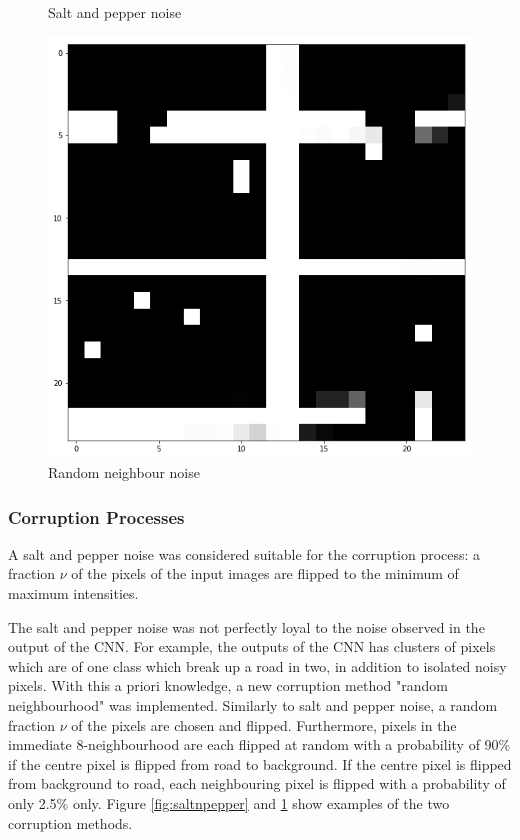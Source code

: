 \documentclass[10pt,conference,compsocconf]{IEEEtran}
\begin{document}
\begin{figure}[!htb]
  \caption{Salt and pepper noise}\label{fig:saltnpepper}
\endminipage\hfill
{}%
  \includegraphics[width=\linewidth]{NoiseExamples_RandomNeighbourhood.png}
  \caption{Random neighbour noise}\label{fig:neighbour}
\endminipage
\end{figure}

\subsubsection{Corruption Processes}

A salt and pepper noise \cite{VincentPASCALVINCENT2010} was considered suitable for the corruption process: a fraction $\nu$ of the pixels of the input images are flipped to the minimum of maximum intensities.

The salt and pepper noise was not perfectly loyal to the noise observed in the output of the CNN. For example, the outputs of the CNN has clusters of pixels which are of one class which break up a road in two, in addition to isolated noisy pixels. With this a priori knowledge, a new corruption method "random neighbourhood" was implemented. Similarly to salt and pepper noise, a random fraction $\nu$ of the pixels are chosen and flipped. Furthermore, pixels in the immediate 8-neighbourhood are each flipped at random with a probability of 90\% if the centre pixel is flipped from road to background. If the centre pixel is flipped from background to road, each neighbouring pixel is flipped with a probability of only 2.5\% only. Figure \ref{fig:saltnpepper} and \ref{fig:neighbour} show examples of the two corruption methods. 
\end{document}
